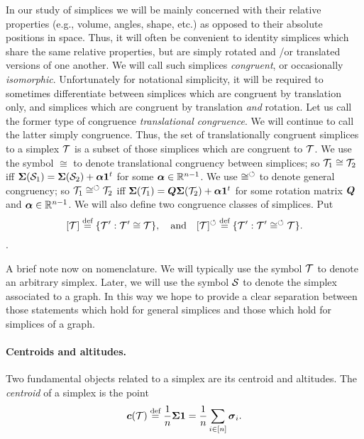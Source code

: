 In  our study of simplices we will be mainly concerned with their relative properties (e.g., volume, angles, shape, etc.) as opposed to their absolute  positions in space. Thus, it will often  be convenient to identity simplices which share the same relative properties, but are simply rotated and /or translated versions of one  another. We will call  such simplices \emph{congruent},  or occasionally \emph{isomorphic}. 
Unfortunately for notational simplicity, it will be  required to  sometimes differentiate between simplices  which are congruent by translation only, and simplices which are congruent by translation \emph{and} rotation. Let us  call the former type of congruence \emph{translational congruence}. We will continue to  call the latter simply congruence. Thus, the set of translationally congruent simplices to a simplex $\mathcal{T}$ is a subset of  those simplices which are congruent to $\mathcal{T}$. 
We use the symbol $\cong$ to denote translational congruency between simplices; so $\mathcal{T}_1\cong\mathcal{T}_2$ iff $\boldsymbol{\Sigma}(\mathcal{S}_1)=\boldsymbol{\Sigma}(\mathcal{S}_2) + \vb*{\alpha}\vb{1}^t$ for some $\vb*{\alpha}\in\mathbb{R}^{n-1}$. We use $\cong^\circlearrowleft$  to denote general   congruency; so  $\mathcal{T}_1\cong^\circlearrowleft\mathcal{T}_2$ iff  $\boldsymbol{\Sigma}(\mathcal{T}_1)=\vb*{Q}\boldsymbol{\Sigma}(\mathcal{T}_2) + \vb*{\alpha}\vb{1}^t$ for some rotation matrix $\vb*{Q}$  and $\vb*{\alpha}\in\mathbb{R}^{n-1}$. 
We will  also define two congruence classes of simplices. Put
\begin{equation}
\label{eq:[ssplx]}
[\mathcal{T}] \overset{\text{def}}{=} \{\mathcal{T}': \mathcal{T}'\cong\mathcal{T}\},\quad \text{and} \quad [\mathcal{T}]^\circlearrowleft\overset{\text{def}}{=} \{\mathcal{T}':\mathcal{T}'\cong^\circlearrowleft\mathcal{T}\}.
\end{equation}.

A brief note now on nomenclature. We will typically  use the symbol $\mathcal{T}$ to denote an arbitrary simplex. Later, we will use the symbol $\mathcal{S}$  to denote  the simplex associated  to a  graph. In  this way we hope to provide a clear separation between those statements which hold for general simplices and those which hold for simplices of a graph. 


\paragraph{Centroids and altitudes.}
Two fundamental objects related to a simplex are its centroid and altitudes. The \emph{centroid} of a simplex is the point 
\begin{equation}
\label{eq:centroid}
\vb*{c}(\mathcal{T}) \overset{\text{def}}{=} \frac{1}{n}\boldsymbol{\Sigma} \vb{1} = \frac{1}{n}\sum_{i\in[n]}\vb*{\sigma}_i.
\end{equation} 


